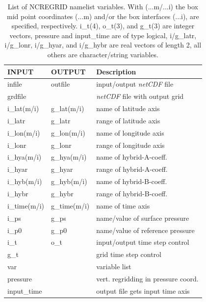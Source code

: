\documentclass[12pt, a4paper]{article}
\begin{document}
\begin{table}
 \centering
\begin{tabular}{|l|l||l|}
\hline
  INPUT &OUTPUT & Description\\
\hline
\hline
  infile      & outfile     & input/output {\it netCDF} file\\
  grdfile     &             & {\it netCDF} file with output grid\\
  i\_lat(m/i) & g\_lat(m/i) & name of latitude axis\\
  i\_latr     & g\_latr     & range of latitude axis\\
  i\_lon(m/i) & g\_lon(m/i) & name of longitude axis\\
  i\_lonr     & g\_lonr     & range of longitude axis\\
  i\_hya(m/i) & g\_hya(m/i) & name of hybrid-A-coeff.\\
  i\_hyar     & g\_hyar     & range of hybrid-A-coeff.\\
  i\_hyb(m/i) & g\_hyb(m/i) & name of hybrid-B-coeff.\\
  i\_hybr     & g\_hybr     & range of hybrid-B-coeff.\\
  i\_time(m/i)& g\_time(m/i)& name of time axis\\
  i\_ps       & g\_ps       & name/value of surface pressure\\
  i\_p0       & g\_p0       & name/value of reference pressure\\
  i\_t        & o\_t        & input/output time step control\\
  g\_t        &             & grid time step control\\
\hline
  var         &             & variable list\\
  pressure    &             & vert. regridding in pressure coord.\\
  input\_time &             & output file gets input time axis\\
\hline
\end{tabular}
\caption[List of NCREGRID namelist variables]
{List of NCREGRID namelist variables. With (...m/...i) the
box mid point coordinates (...m) and/or the box interfaces (...i),
are specified, respectively.
i\_t(4), o\_t(3), and g\_t(3) are integer vectors, pressure 
and input\_time are of type logical,
i/g\_latr, i/g\_lonr, i/g\_hyar, and i/g\_hybr are real vectors
of length 2, 
all others are character/string variables.}
\label{tab:namelist}
\end{table}
\end{document}
